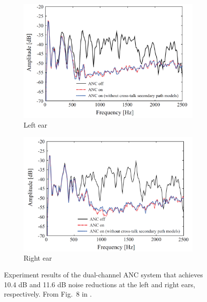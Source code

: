\begin{figure}[!htb]
    \centering
    \begin{subfigure}{0.475\textwidth}
        \centering
        \includegraphics[width = \textwidth]{fig/tanaka2017_1660x1120a.png}
        \caption{Left ear}
    \end{subfigure}
    \begin{subfigure}{0.475\textwidth}
        \centering
        \includegraphics[width = \textwidth]{fig/tanaka2017_1660x1120b.png}
        \caption{Right ear}
    \end{subfigure}
    \caption{Experiment results of the dual-channel ANC system that achieves 10.4 dB and 11.6 dB noise reductions at the left and right ears, respectively. From Fig.~8 in \cite{Tanaka2017BinauralActiveNoise}.}
    \label{fig:tanaka_2017_results}
\end{figure}


